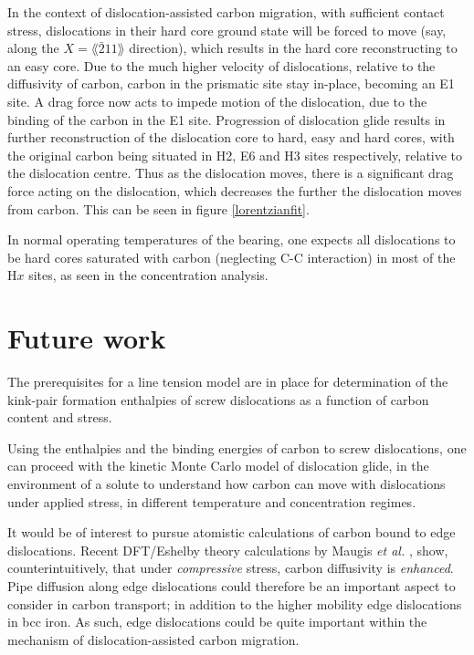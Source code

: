 \documentclass[a4paper,11pt]{article}
\begin{document}
In the context of dislocation-assisted carbon migration, with sufficient contact stress,
dislocations in their hard core ground state will be forced to move (say, along the \(X =
    \lang\bar{2}11\rang\) direction), which results in the hard core reconstructing to an easy core. Due to
the much higher velocity of dislocations, relative to the diffusivity of carbon, carbon in the
prismatic site stay in-place, becoming an E1 site. A drag force now acts to impede motion of the
dislocation, due to the binding of the carbon in the E1 site. Progression of dislocation glide
results in further reconstruction of the dislocation core to hard, easy and hard cores, with the
original carbon being situated in H2, E6 and H3 sites respectively, relative to the dislocation
centre. Thus as the dislocation moves, there is a significant drag force acting on the
dislocation, which decreases the further the dislocation moves from carbon. This can be seen in
figure \ref{lorentzianfit}. 


In normal operating temperatures of the bearing, one expects all dislocations to be hard cores
saturated with carbon (neglecting C-C interaction) in most of the \(\text{H}x\) sites, as seen in
the concentration analysis.



\section{Future work}
\label{sec:orga08f34c}

The prerequisites for a line tension model are in place for determination of the
kink-pair formation enthalpies of screw dislocations as a function of carbon
content and stress. 

Using the enthalpies and the binding energies of carbon to screw dislocations, one can proceed
with the kinetic Monte Carlo model of dislocation glide, in the environment of a solute to
understand how carbon can move with dislocations under applied stress, in different temperature
and concentration regimes.


It would be of interest to pursue atomistic calculations of carbon bound to edge
dislocations. Recent DFT/Eshelby theory calculations by Maugis \emph{et al.} \cite{Maugis2020}, show,
counterintuitively, that under \emph{compressive} stress, carbon diffusivity is \emph{enhanced}. Pipe
diffusion along edge dislocations could therefore be an important aspect to consider in carbon transport; in
addition to the higher mobility edge dislocations in bcc iron. As such, edge dislocations could be quite
important within the mechanism of dislocation-assisted carbon migration. 
\end{document}
